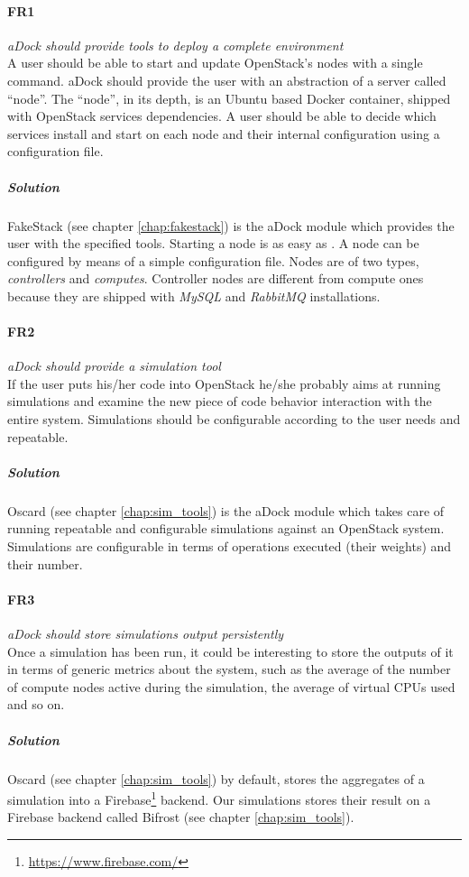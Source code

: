 \paragraph{FR1}\label{p:fr1} \emph{aDock should provide tools to deploy a complete environment} \hfill \\
A user should be able to start and update OpenStack's nodes with a single command. aDock should provide the user with an abstraction of a server called ``node''. The ``node'', in its depth, is an Ubuntu based Docker container, shipped with OpenStack services dependencies. A user should be able to decide which services install and start on each node and their internal configuration using a configuration file.
\subparagraph{Solution} FakeStack (see chapter \ref{chap:fakestack}) is the aDock module which provides the user with the specified tools. Starting a node is as easy as . A node can be configured by means of a simple configuration file. Nodes are of two types, \textit{controllers} and \textit{computes}. Controller nodes are different from compute ones because they are shipped with \textit{MySQL} and \textit{RabbitMQ} installations.

\paragraph{FR2}\label{p:fr2} \emph{aDock should provide a simulation tool} \hfill \\
If the user puts his/her code into OpenStack he/she probably aims at running simulations and examine the new piece of code behavior interaction with the entire system. Simulations should be configurable according to the user needs and repeatable.
\subparagraph{Solution} Oscard (see chapter \ref{chap:sim_tools}) is the aDock module which takes care of running repeatable and configurable simulations against an OpenStack system. Simulations are configurable in terms of operations executed (their weights) and their number.

\paragraph{FR3}\label{p:fr3} \emph{aDock should store simulations output persistently} \hfill \\
Once a simulation has been run, it could be interesting to store the outputs of it in terms of generic metrics about the system, such as the average of the number of compute nodes active during the simulation, the average of virtual CPUs used and so on.
\subparagraph{Solution} Oscard (see chapter \ref{chap:sim_tools}) by default, stores the aggregates of a simulation into a Firebase\footnote{\url{https://www.firebase.com/}} backend. Our simulations stores their result on a Firebase backend called Bifrost (see chapter \ref{chap:sim_tools}).

